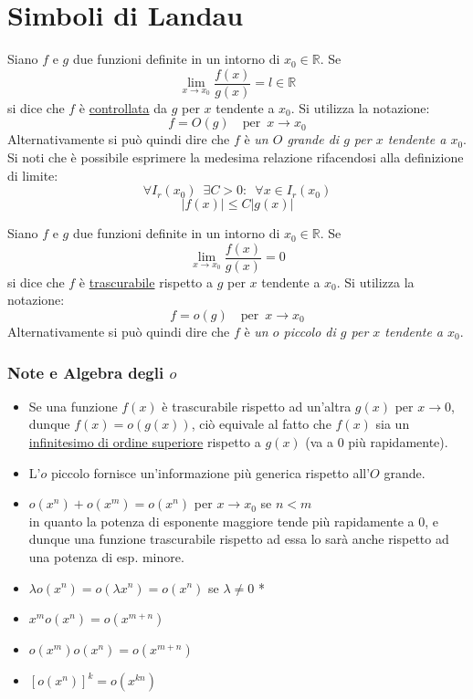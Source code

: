 \documentclass[10pt, oneside]{book}
\theoremstyle{plain}
\begin{document}
\section{Simboli di Landau}
\begin{defin}
Siano $f$ e $g$ due funzioni definite in un intorno di $x_0 \in \mathbb{R}$. Se
\[\lim \limits_{x \rightarrow x_0} \frac{f(x)}{g(x)} = l \in \mathbb{R}\] si dice che $f$ è \underline{controllata} da $g$ per $x$ tendente a $x_0$. Si utilizza la notazione:
\[f = O(g) \quad \textrm{per} \enspace x \rightarrow x_0\]
Alternativamente si può quindi dire che $f$ è \textit{un $O$ grande di $g$ per $x$ tendente a $x_0$}.\\
Si noti che è possibile esprimere la medesima relazione rifacendosi alla definizione di limite:
\[\forall I_r(x_0) \enspace \exists C > 0 : \enspace \forall x \in I_r(x_0)\]
\[|f(x)| \leq C |g(x)|\]
\end{defin}

\begin{defin}
Siano $f$ e $g$ due funzioni definite in un intorno di $x_0 \in \mathbb{R}$. Se
\[\lim \limits_{x \rightarrow x_0} \frac{f(x)}{g(x)} = 0\] si dice che $f$ è \underline{trascurabile} rispetto a $g$ per $x$ tendente a $x_0$. Si utilizza la notazione:
\[f = o(g) \quad \textrm{per} \enspace x \rightarrow x_0\]
Alternativamente si può quindi dire che $f$ è \textit{un $o$ piccolo di $g$ per $x$ tendente a $x_0$}.
\end{defin}

\subsubsection*{Note e Algebra degli $o$}
\begin{itemize}[label=$\ast$]
\item Se una funzione $f(x)$ è trascurabile rispetto ad un'altra $g(x)$ per $x \rightarrow 0$, dunque $f(x) = o(g(x))$, ciò equivale al fatto che $f(x)$ sia un \underline{infinitesimo di ordine superiore} rispetto a $g(x)$ (va a 0 più rapidamente).
\item L'$o$ piccolo fornisce un'informazione più generica rispetto all'$O$ grande.
\item $o(x^n) + o(x^m) = o(x^n)$ per $x \rightarrow x_0$ se $n < m$ \\ in quanto la potenza di esponente maggiore tende più rapidamente a 0, e dunque una funzione trascurabile rispetto ad essa lo sarà anche rispetto ad una potenza di esp. minore.
\item $\lambda o(x^n) = o(\lambda x^n) = o(x^n)$ se $\lambda \neq 0$ \hypertarget{opiccoli}{*}
\item $x^m o(x^n) = o(x^{m+n})$
\item $o(x^m) o(x^n) = o(x^{m+n})$
\item $[o(x^n)]^k = o(x^{kn})$
\end{itemize}
\end{document}
